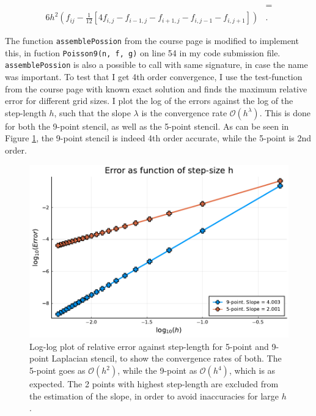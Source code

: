 \documentclass[aps, 12pt]{revtex4}
\begin{document}
\begin{align*}
    [20u_{i,j} - 4u_{i-1,j} - 4u_{i+1,j} - 4u_{i,j-1} - 4u_{i,j+1} - 1u_{i+1,j+1} - 1u_{i+1,j-1} - 1u_{i-1,j+1} - 1u_{i-1,j-1}] & =
    \\
    6h^2\left(f_{ij} -\frac{1}{12}[4f_{i,j} - f_{i-1,j} - f_{i+1,j} - f_{i,j-1} - f_{i,j+1}] \right)                            & .
\end{align*}

The function \texttt{assemblePossion} from the course page is modified to implement this, in fuction \texttt{Poisson9(n, f, g)} on line 54 in my code submission file. \texttt{assemblePossion} is also a possible to call with same signature, in case the name was important. To test that I get 4th order convergence, I use the test-function from the course page with known exact solution and finds the maximum relative error for different grid sizes. I plot the log of the errors against the log of the step-length $h$, such that the slope $\lambda$ is the convergence rate $\mathcal{O}(h^{\lambda})$. This is done for both the 9-point stencil, as well as the 5-point stencil. As can be seen in Figure \ref{fig:gridRef}, the 9-point stencil is indeed 4th order accurate, while the 5-point is 2nd order.

\begin{figure}
    \includegraphics[width=0.8\linewidth]{gridRefinement.pdf}
    \caption{Log-log plot of relative error against step-length for 5-point and 9-point Laplacian stencil, to show the convergence rates of both. The 5-point goes as $\mathcal{O}(h^2)$, while the 9-point as $\mathcal{O}(h^4)$, which is as expected. The 2 points with highest step-length are excluded from the estimation of the slope, in order to avoid inaccuracies for large $h$.}
    \label{fig:gridRef}
\end{figure}
\end{document}
